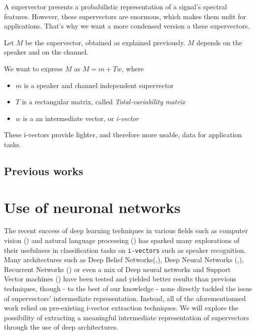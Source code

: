 \documentclass[conference]{IEEEtran}
\begin{document}
A supervector presents a probabilistic representation of a signal's spectral features. 
However, these supervectors are enormous, which makes them unfit for applications.
That's why we want a more condensed version a these supervectors.


Let $M$ be the supervector, obtained as explained previously. $M$ depends on the speaker and on the channel. 


We want to express $M$ as $M = m + Tw$, where
\begin{itemize}
\item $m$ is a speaker and channel independent supervector
\item $T$ is a rectangular matrix, called \emph{Total-variability matrix}
\item $w$ is a an intermediate vector, or \emph{i-vector}
\end{itemize}

These i-vectors provide lighter, and therefore more usable, data for application tasks.

\subsection{Previous works}

\section{Use of neuronal networks}

The recent success of deep learning techniques in various fields such as
computer vision (\cite{lecun1998gradient}) and natural language processing (\cite{bordes2012joint}) has sparked
many explorations of their usefulness in classification tasks on
\texttt{i-vectors} such as speaker recognition. Many architectures such as Deep
Belief Networks(\cite{DBLP:journals/corr/GhahabiH15},\cite{ghahabi2014deep}),
Deep Neural Networks
(\cite{DBLP:journals/corr/GhahabiH15},\cite{ghahabi2014deep}), Recurrent
Networks (\cite{DBLP:journals/corr/SaonSRK16}) or even a mix of
Deep neural networks and Support Vector machines (\cite{richardson2015deep}) have been tested and yielded
better results than previous techniques, though - to the best of our knowledge -
none directly tackled the issue of supervectors' intermediate representation.
Instead, all of the aforementionned work relied on pre-existing i-vector
extraction techniques. We will explore the possibility of extracting a
meaningful intermediate representation of supervectors through the use of deep architectures.
\end{document}
